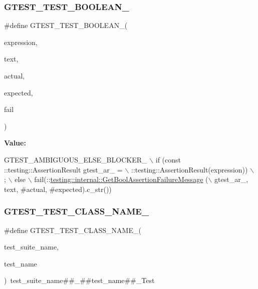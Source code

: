 \subsubsection{\texorpdfstring{G\+T\+E\+S\+T\+\_\+\+T\+E\+S\+T\+\_\+\+B\+O\+O\+L\+E\+A\+N\+\_\+}{GTEST\_TEST\_BOOLEAN\_}}
{\footnotesize\ttfamily \#define G\+T\+E\+S\+T\+\_\+\+T\+E\+S\+T\+\_\+\+B\+O\+O\+L\+E\+A\+N\+\_\+(\begin{DoxyParamCaption}\item[{}]{expression,  }\item[{}]{text,  }\item[{}]{actual,  }\item[{}]{expected,  }\item[{}]{fail }\end{DoxyParamCaption})}

{\bfseries Value\+:}
\begin{DoxyCode}
GTEST\_AMBIGUOUS\_ELSE\_BLOCKER\_ \(\backslash\)
  if (const ::testing::AssertionResult gtest\_ar\_ = \(\backslash\)
      ::testing::AssertionResult(expression)) \(\backslash\)
    ; \(\backslash\)
  else \(\backslash\)
    fail(::\hyperlink{namespacetesting_1_1internal_aed8d3ad4341f8f2de53440e39c995632}{testing::internal::GetBoolAssertionFailureMessage}
      (\(\backslash\)
        gtest\_ar\_, text, #actual, #expected).c\_str())
\end{DoxyCode}
\mbox{\label{gtest-internal_8h_ad4bc4ec847a06e7de981e81c9bb116cf}} 
\subsubsection{\texorpdfstring{G\+T\+E\+S\+T\+\_\+\+T\+E\+S\+T\+\_\+\+C\+L\+A\+S\+S\+\_\+\+N\+A\+M\+E\+\_\+}{GTEST\_TEST\_CLASS\_NAME\_}}
{\footnotesize\ttfamily \#define G\+T\+E\+S\+T\+\_\+\+T\+E\+S\+T\+\_\+\+C\+L\+A\+S\+S\+\_\+\+N\+A\+M\+E\+\_\+(\begin{DoxyParamCaption}\item[{}]{test\+\_\+suite\+\_\+name,  }\item[{}]{test\+\_\+name }\end{DoxyParamCaption})~test\+\_\+suite\+\_\+name\#\#\+\_\+\#\#test\+\_\+name\#\#\+\_\+\+Test}

